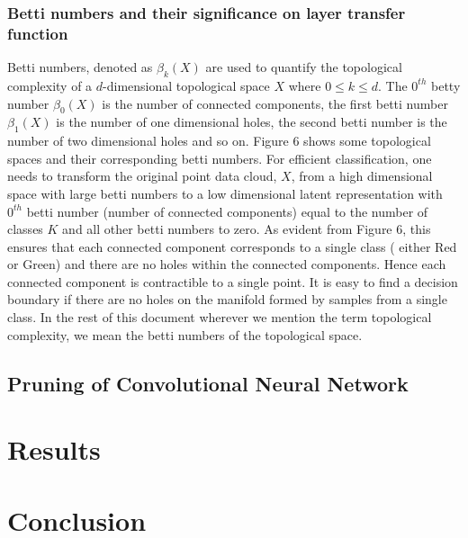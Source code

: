 \documentclass{bmvc2k}
\begin{document}
\subsubsection{Betti numbers and their significance on  layer transfer function}
Betti numbers, denoted as $\beta_k(X)$  are used to quantify the topological complexity of a $d$-dimensional topological space $X$ where $0 \leq k \leq d$. The $0^{th}$ betty number $\beta_0(X)$ is the number of connected components, the first betti number $\beta_1(X)$ is the number of one dimensional holes, the second betti number is the number of two dimensional holes and so on. Figure 6 shows some topological spaces and their corresponding betti numbers. For efficient classification, one needs to transform the original point data cloud, $X$,  from a high dimensional space with large betti numbers to a low dimensional latent representation with $0^{th}$ betti number (number of connected components) equal to the number of classes $K$ and all other betti numbers to zero. As evident from Figure 6, this ensures that each connected component  corresponds to a single class ( either Red or Green) and there are no holes within the connected components. Hence  each connected component is contractible  to a single point. It is easy to find a decision boundary if there are no holes on the manifold formed by samples from a  single class.  In the rest of this document wherever we mention the term  topological complexity, we mean the betti numbers of the topological space.
\subsection{Pruning of Convolutional Neural Network}
\label{network_pruning}
\section{Results}
\section{Conclusion}








\end{document}

